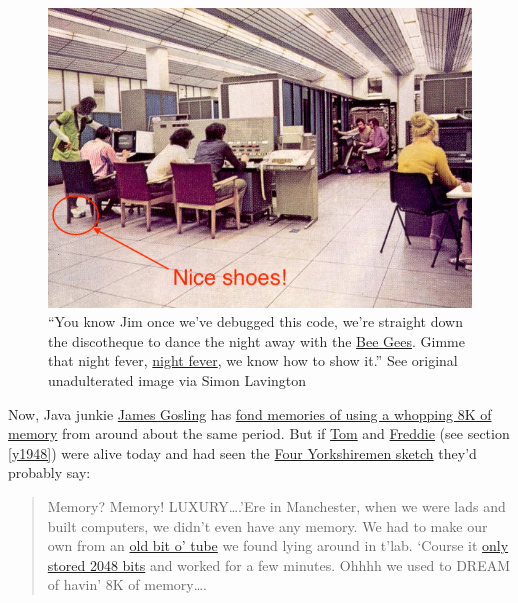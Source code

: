 \documentclass[
  12pt,
]{book}
\begin{document}
\begin{figure}

{\centering \includegraphics[width=0.99\linewidth]{images/classof1970something2} 

}

\caption{``You know Jim once we've debugged this code, we're straight down the discotheque to dance the night away with the \href{https://en.wikipedia.org/wiki/Bee_Gees}{Bee Gees}. Gimme that night fever, \href{https://en.wikipedia.org/wiki/Night_Fever}{night fever}, we know how to show it.'' See original unadulterated image via Simon Lavington \citep{mu5}}\label{fig:mu5-fig}
\end{figure}



Now, Java junkie \href{https://en.wikipedia.org/wiki/James_Gosling}{James Gosling} has \href{http://web.archive.org/web/20041010131526/http://today.java.net/jag/page6.html\#51}{fond memories of using a whopping 8K of memory} from around about the same period. But if \href{https://en.wikipedia.org/wiki/Tom_Kilburn}{Tom} and \href{https://en.wikipedia.org/wiki/Frederic_Calland_Williams}{Freddie} (see section \ref{y1948}) were alive today and had seen the \href{https://en.wikipedia.org/wiki/Four_Yorkshiremen_sketch}{Four Yorkshiremen sketch} they'd probably say:

\begin{quote}
Memory? Memory! LUXURY\ldots.'Ere in Manchester, when we were lads and built computers, we didn't even
have any memory. We had to make our own from an \href{https://en.wikipedia.org/wiki/Williams_tube}{old bit o' tube} we found lying around in t'lab.
`Course it \href{http://curation.cs.manchester.ac.uk/computer50/www.computer50.org/mark1/ip-mm1.crt2048.html}{only stored 2048 bits} and worked for a few minutes. Ohhhh we used to DREAM of havin' 8K of
memory\ldots.
\end{quote}
\end{document}
